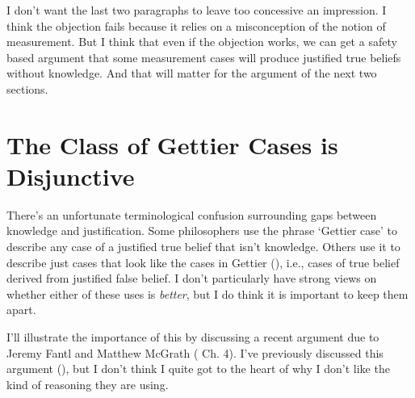 \documentclass[
  11pt,
  letterpaper,
  DIV=11,
  numbers=noendperiod,
  twoside]{scrartcl}
\begin{document}
I don't want the last two paragraphs to leave too concessive an
impression. I think the objection fails because it relies on a
misconception of the notion of measurement. But I think that even if the
objection works, we can get a safety based argument that some
measurement cases will produce justified true beliefs without knowledge.
And that will matter for the argument of the next two sections.

\section{The Class of Gettier Cases is
Disjunctive}\label{the-class-of-gettier-cases-is-disjunctive}

There's an unfortunate terminological confusion surrounding gaps between
knowledge and justification. Some philosophers use the phrase `Gettier
case' to describe any case of a justified true belief that isn't
knowledge. Others use it to describe just cases that look like the cases
in Gettier (), i.e., cases of true
belief derived from justified false belief. I don't particularly have
strong views on whether either of these uses is \emph{better}, but I do
think it is important to keep them apart.

I'll illustrate the importance of this by discussing a recent argument
due to Jeremy Fantl and Matthew McGrath
( Ch. 4). I've
previously discussed this argument
(), but I don't
think I quite got to the heart of why I don't like the kind of reasoning
they are using.
\end{document}
